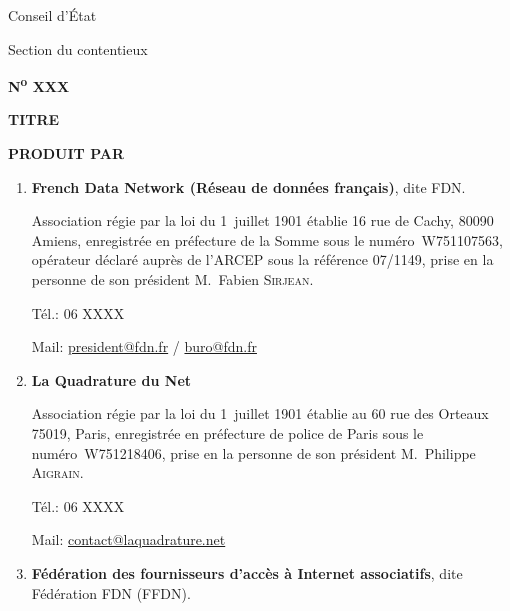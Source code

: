 \begin{titlepage}
\newenvironment{marges}[2]{
\begin{list}{}{\setlength{\leftmargin}{#1}%
\setlength{\rightmargin}{#2}}\item}
{\end{list}}

\pagestyle{empty}

\begin{marges}{-0.6in}{-0.6in}

\begin{minipage}{5cm}\centering
Conseil d'État\par
Section du contentieux\par
\textbf{N\textsuperscript{o} XXX}
\end{minipage}

\vskip 1cm

\begin{center}\LARGE\bfseries
  TITRE
\end{center}

\vskip 1cm

\textbf{PRODUIT PAR}

\begin{enumerate}
\item \textbf{French Data Network (Réseau de données français)}, dite FDN.

Association    régie par la loi du 1\ier~juillet  1901 établie 16 rue de Cachy,  80090   Amiens, enregistrée en préfecture  de la Somme sous le    numéro~W751107563, opérateur déclaré auprès de  l'ARCEP sous la    référence 07/1149, prise en la personne de son président  M.~Fabien    \textsc{Sirjean}.

Tél.: 06 XXXX

Mail: \url{president@fdn.fr} / \url{buro@fdn.fr}

\item \textbf{La Quadrature du Net}

Association    régie par la loi du 1\ier~juillet  1901 établie au 60 rue des Orteaux    75019, Paris, enregistrée en  préfecture de police de Paris sous le    numéro~W751218406, prise en la  personne de son président M.~Philippe    \textsc{Aigrain}.

Tél.: 06 XXXX

Mail:  \url{contact@laquadrature.net}

\item \textbf{Fédération des fournisseurs d'accès à Internet associatifs}, dite Fédération FDN (FFDN).


\end{enumerate}
\end{marges}
\end{titlepage}
